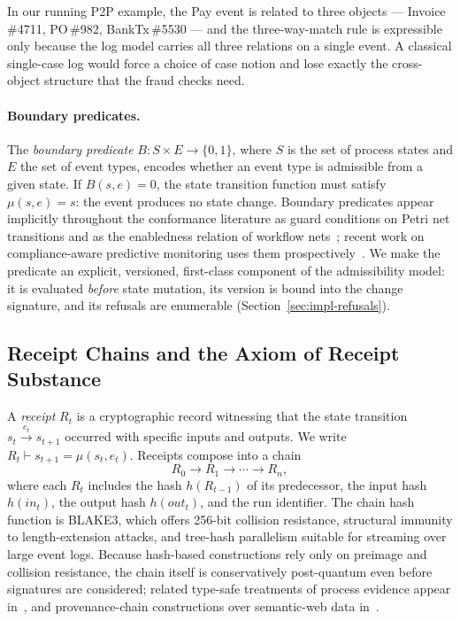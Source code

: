 In our running P2P example, the \textsf{Pay} event is related to three objects
--- \textsf{Invoice\,\#4711}, \textsf{PO\,\#982}, \textsf{BankTx\,\#5530} ---
and the three-way-match rule is expressible only because the log model carries
all three relations on a single event. A classical single-case log would force
a choice of case notion and lose exactly the cross-object structure that the
fraud checks need.

\paragraph{Boundary predicates.}
The \emph{boundary predicate} $B : S \times E \to \{0,1\}$, where $S$ is the
set of process states and $E$ the set of event types, encodes whether an event
type is admissible from a given state. If $B(s,e) = 0$, the state transition
function must satisfy $\mu(s,e) = s$: the event produces no state change.
Boundary predicates appear implicitly throughout the conformance literature as
guard conditions on Petri net transitions and as the enabledness relation of
workflow nets~\cite{van_der_aalst_wfnet_soundness_1997}; recent work on
compliance-aware predictive monitoring uses them
prospectively~\cite{de_santis_compliance_predictive_2024}. We make the
predicate an explicit, versioned, first-class component of the admissibility
model: it is evaluated \emph{before} state mutation, its version is bound into
the change signature, and its refusals are enumerable
(Section~\ref{sec:impl-refusals}).

\subsection{Receipt Chains and the Axiom of Receipt Substance}
\label{sec:bg-receipts}

A \emph{receipt} $R_t$ is a cryptographic record witnessing that the state
transition $s_t \xrightarrow{e_t} s_{t+1}$ occurred with specific inputs and
outputs. We write $R_t \vdash s_{t+1} = \mu(s_t, e_t)$. Receipts compose into
a chain
\[
  R_0 \to R_1 \to \cdots \to R_n,
\]
where each $R_t$ includes the hash $h(R_{t-1})$ of its predecessor, the input
hash $h(\textit{in}_t)$, the output hash $h(\textit{out}_t)$, and the run
identifier. The chain hash function is BLAKE3, which offers 256-bit collision
resistance, structural immunity to length-extension attacks, and tree-hash
parallelism suitable for streaming over large event logs. Because hash-based
constructions rely only on preimage and collision resistance, the chain itself
is conservatively post-quantum even before signatures are considered; related
type-safe treatments of process evidence appear
in~\cite{type_safe_process_evidence_2024}, and provenance-chain constructions
over semantic-web data in~\cite{provenance_semantic_web_2025}.

